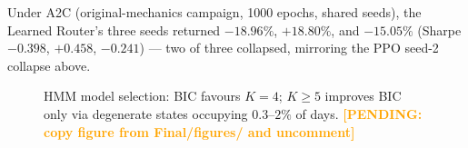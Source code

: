 \documentclass[sigconf,anonymous,review]{acmart}
\newcommand{\pending}[1]{\textcolor{orange}{\textbf{[PENDING: #1]}}}
\begin{document}
Under A2C (original-mechanics campaign, 1000 epochs, shared seeds), the
Learned Router's three seeds returned $-18.96\%$, $+18.80\%$, and
$-15.05\%$ (Sharpe $-0.398$, $+0.458$, $-0.241$) --- two of three
collapsed, mirroring the PPO seed-2 collapse above.

\begin{figure}[t]
\centering
\caption{HMM model selection: BIC favours $K{=}4$; $K\geq5$ improves BIC
only via degenerate states occupying $0.3$--$2\%$ of days.
\pending{copy figure from Final/figures/ and uncomment}}
\label{fig:bic}
\end{figure}
\end{document}
